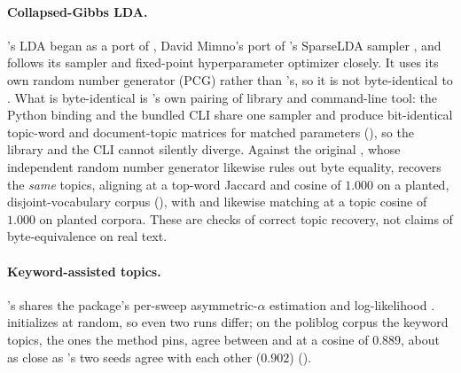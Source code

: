 \documentclass[article,nojss]{jss}
\begin{document}
\paragraph{Collapsed-Gibbs LDA.} 's LDA began as a port of
, David Mimno's  port of 's SparseLDA
sampler \citep{yao2009sparselda}, and follows its sampler and fixed-point
hyperparameter optimizer closely. It uses its own random number generator (PCG)
rather than 's, so it is not byte-identical to .
What is byte-identical is 's own pairing of library and command-line
tool: the Python binding and the bundled  CLI share one sampler and
produce bit-identical topic-word and document-topic matrices for matched
parameters (), so the library and the CLI cannot
silently diverge. Against the original  , whose
independent random number generator likewise rules out byte equality, 
recovers the \emph{same} topics, aligning at a top-word Jaccard and cosine of
$1.000$ on a planted, disjoint-vocabulary corpus (),
with  and  likewise matching  at a topic
cosine of $1.000$ on planted corpora. These are checks of correct topic recovery,
not claims of byte-equivalence on real text.

\paragraph{Keyword-assisted topics.} 's  shares the
  package's per-sweep asymmetric-$\alpha$ estimation and
 log-likelihood \citep{eshima2024keyatm}. 
initializes at random, so even two  runs differ; on the poliblog
corpus the keyword topics, the ones the method pins, agree between 
and  at a cosine of $0.889$, about as close as 's two seeds
agree with each other ($0.902$) ().
\end{document}
